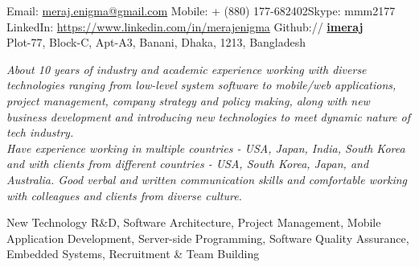 \documentclass[10pt,a4paper]{article} %
\begin{document}
 



\noindent Email: \href{mailto:meraj.enigma@gmail.com}{meraj.enigma@gmail.com}\bull %
\textsmaller Mobile: {+} (880) 177-682402\bull Skype: mmm2177 \\ %
LinkedIn: \href{https://www.linkedin.com/in/merajenigma}{https://www.linkedin.com/in/merajenigma} \bull  Github:// \href{https://github.com/imeraj}{\bf imeraj} \\%
 Plot-77, Block-C, Apt-A3, Banani, Dhaka, 1213, Bangladesh %

\spacedhrule{0.9em}{-0.4em} %



\vspace{-1.3em} %

\begin{multicols}{2}  %
\noindent \textit{About 10 years of industry and academic experience working with diverse technologies ranging from low-level system software to mobile/web applications, project management, company strategy and policy making, along with new business development and introducing new technologies to meet dynamic nature of tech industry.\\
Have experience working in multiple countries - USA, Japan, India, South Korea and with clients from different countries - USA, South Korea, Japan, and Australia. Good verbal and written communication skills and comfortable working with colleagues and clients from diverse culture.}
\end{multicols}

 New Technology R\&D, Software Architecture, Project Management, Mobile Application Development, Server-side Programming, Software Quality Assurance, Embedded Systems, Recruitment \& Team Building\\
\end{document}
